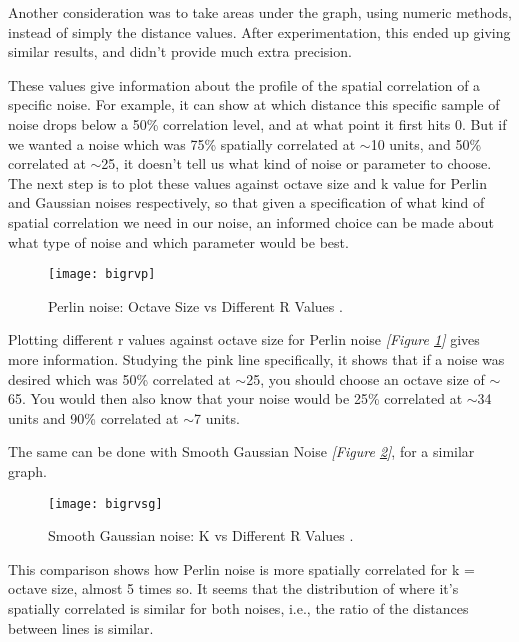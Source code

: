 \documentclass[11pt,a4paper]{article}
\begin{document}
Another consideration was to take areas under the graph, using numeric methods, instead of simply the distance values. After experimentation, this ended up giving similar results, and didn’t provide much extra precision.

These values give information about the profile of the spatial correlation of a specific noise. For example, it can show at which distance this specific sample of noise drops below a 50\% correlation level, and at what point it first hits 0. But if we wanted a noise which was 75\% spatially correlated at $\sim$10 units, and 50\% correlated at $\sim$25, it doesn’t tell us what kind of noise or parameter to choose. The next step is to plot these values against octave size and k value for Perlin and Gaussian noises respectively, so that given a specification of what kind of spatial correlation we need in our noise, an informed choice can be made about what type of noise and which parameter would be best.

\begin{figure}[h]
	\centering
	\texttt{[image: bigrvp]}
	\caption{Perlin noise: Octave Size vs Different R Values \newline [250 by 250 sample].}
	\label{fig:bigrvp}
\end{figure}

Plotting different r values against octave size for Perlin noise \emph{[Figure \ref{fig:bigrvp}]} gives more information. Studying the pink line specifically, it shows that if a noise was desired which was 50\% correlated at $\sim$25, you should choose an octave size of $\sim$65. You would then also know that your noise would be 25\% correlated at $\sim$34 units and 90\% correlated at $\sim$7 units.

The same can be done with Smooth Gaussian Noise \emph{[Figure \ref{fig:bigrvsg}]}, for a similar graph.

\begin{figure}[h]
	\centering
	\texttt{[image: bigrvsg]}
	\caption{Smooth Gaussian noise: K vs Different R Values \newline [250 by 250 sample].}
	\label{fig:bigrvsg}
\end{figure}

This comparison shows how Perlin noise is more spatially correlated for k = octave size, almost 5 times so. It seems that the distribution of where it’s spatially correlated is similar for both noises, i.e., the ratio of the distances between lines is similar.
\end{document}
